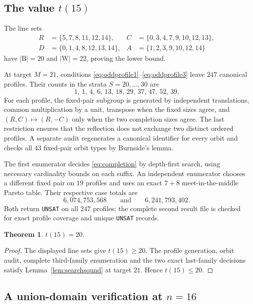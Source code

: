 \documentclass[11pt]{amsart}
\newtheorem{theorem}{Theorem}
\theoremstyle{definition}
\theoremstyle{remark}
\newcommand{\Bl}{\mathrm{B}}
\newcommand{\Wh}{\mathrm{W}}
\begin{document}
\subsection{The value \texorpdfstring{$t(15)$}{t(15)}}\label{ssec:t15}

The line sets
\[
\begin{aligned}
R&=\{5,7,8,11,12,14\},&
C&=\{0,3,4,7,9,10,12,13\},\\
D&=\{0,1,4,8,12,13,14\},&
A&=\{1,2,3,9,10,12,14\}
\end{aligned}
\]
have $|\Bl|=20$ and $|\Wh|=22$, proving the lower bound.

At target $M=21$, conditions \eqref{eq:oddprofile1}--\eqref{eq:oddprofile3}
leave $247$ canonical profiles.  Their counts in the strata
$S=20,\ldots,30$ are
\[
1,\,1,\,4,\,6,\,13,\,18,\,29,\,37,\,47,\,52,\,39.
\]
For each profile, the fixed-pair subgroup is generated by independent
translations, common multiplication by a unit, transpose when the fixed
sizes agree, and $(R,C)\mapsto(R,-C)$ only when the two completion sizes
agree.  The last restriction ensures that the reflection does not exchange
two distinct ordered profiles.  A separate audit regenerates a canonical
identifier for every orbit and checks all $43$ fixed-pair orbit types by
Burnside's lemma.

The first enumerator decides \eqref{eq:completion} by depth-first search,
using necessary cardinality bounds on each suffix.  An independent
enumerator chooses a different fixed pair on $19$ profiles and uses an exact
$7+8$ meet-in-the-middle Pareto table.  Their respective case totals are
\[
6{,}074{,}753{,}568\qquad\text{and}\qquad6{,}241{,}793{,}402.
\]
Both return \texttt{UNSAT} on all $247$ profiles; the complete second result
file is checked for exact profile coverage and unique \texttt{UNSAT} records.

\begin{theorem}\label{thm:t15}
$t(15)=20$.
\end{theorem}

\begin{proof}
The displayed line sets give $t(15)\ge20$.  The profile generation,
orbit audit, complete third-family enumeration and the two exact
last-family decisions satisfy Lemma~\ref{lem:searchsound} at target $21$.
Hence $t(15)\le20$.
\end{proof}

\subsection{A union-domain verification at \texorpdfstring{$n=16$}{n=16}}
\label{ssec:t16}
\end{document}
